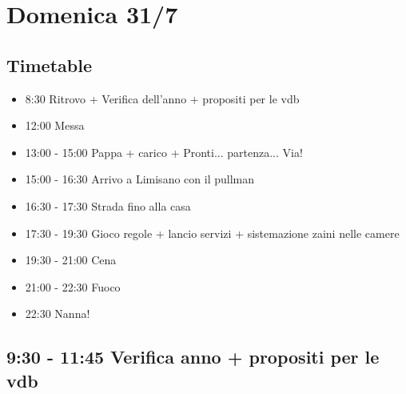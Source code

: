 \documentclass[../main.tex]{subfiles}
\begin{document}
    \section{Domenica 31/7}
    \subsection{Timetable}
    \begin{itemize}
        \item 8:30 Ritrovo + Verifica dell'anno + propositi per le vdb
        \item 12:00 Messa
        \item 13:00 - 15:00 Pappa + carico + Pronti... partenza... Via!
        \item 15:00 - 16:30 Arrivo a Limisano con il pullman
        \item 16:30 - 17:30 Strada fino alla casa
        \item 17:30 - 19:30 Gioco regole + lancio servizi + sistemazione zaini nelle camere
        \item 19:30 - 21:00 Cena
        \item 21:00 - 22:30 Fuoco
        \item 22:30 Nanna!
    \end{itemize}


    \subsection{9:30 - 11:45 Verifica anno + propositi per le vdb}
\end{document}
